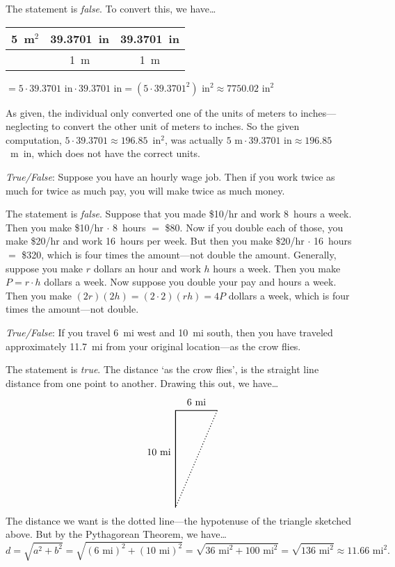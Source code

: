 \documentclass[11pt,letterpaper]{article}
\begin{document}
\sol The statement is \textit{false}. To convert this, we have\dots \par
	\begin{table}[!ht]
	\centering
	\begin{tabular}{c|c|c}
	5~m$^2$ & 39.3701~in & 39.3701~in \\ \hline
		     & 1~m 		  & 1~m 
	\end{tabular}
	$= 5 \cdot 39.3701 \text{ in} \cdot 39.3701 \text{ in}= (5 \cdot 39.3701^2) \text{ in}^2 \approx 7750.02 \text{ in}^2$
	\end{table}
As given, the individual only converted one of the units of meters to inches---neglecting to convert the other unit of meters to inches. So the given computation, $5 \cdot 39.3701 \approx 196.85$~in$^2$, was actually $5 \text{ m} \cdot 39.3701 \text{ in} \approx 196.85$~m~in, which does not have the correct units. \vfill



\quizsol \textit{True/False}: Suppose you have an hourly wage job. Then if you work twice as much for twice as much pay, you will make twice as much money. \pspace

\sol The statement is \textit{false}. Suppose that you made \$10/hr and work 8~hours a week. Then you make \$10/hr $\cdot$ 8~hours $=$ \$80. Now if you double each of those, you make \$20/hr and work 16~hours per week. But then you make \$20/hr $\cdot$ 16~hours $=$ \$320, which is four times the amount---not double the amount. Generally, suppose you make $r$ dollars an hour and work $h$ hours a week. Then you make $P= r \cdot h$ dollars a week. Now suppose you double your pay and hours a week. Then you make $(2r)(2h)= (2 \cdot 2)(rh)= 4P$ dollars a week, which is four times the amount---not double. \vfill





\newpage





\quizsol \textit{True/False}: If you travel 6~mi west and 10~mi south, then you have traveled approximately 11.7~mi from your original location---as the crow flies. \pspace

\sol The statement is \textit{true}. The distance `as the crow flies', is the straight line distance from one point to another. Drawing this out, we have\dots
	\[
	\begin{tikzpicture}
	\draw[line width= 0.03cm,black] (0,0) -- (-1.5,0) -- (-1.5,-3.5);
	\node at (-0.75,0.3) {$6$~mi};
	\node at (-2.1,-1.5) {$10$~mi};
	\draw[line width= 0.03cm,black,dotted] (0,0) -- (-1.5,-3.5);
	\end{tikzpicture}
	\] 
The distance we want is the dotted line---the hypotenuse of the triangle sketched above. But by the Pythagorean Theorem, we have\dots
	\[
	d= \sqrt{a^2 + b^2}= \sqrt{(6 \text{ mi})^2 + (10 \text{ mi})^2}= \sqrt{36 \text{ mi}^2 + 100 \text{ mi}^2}= \sqrt{136 \text{ mi}^2} \approx 11.66 \text{ mi}^2.
	\]
\end{document}
